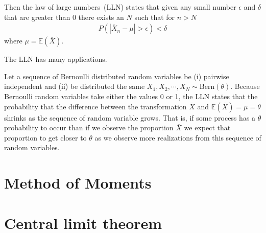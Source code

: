 Then the law of large numbers~(LLN) states that given any small number $\epsilon$ and $\delta$ that are greater than 0 there exists an $N$ such that for $n > N$
\begin{align}
    P( | \overline{X}_{n} - \mu | > \epsilon ) < \delta
\end{align}
where $\mu = \mathbb{E}(\overline{X})$.

The LLN has many applications. 

\ex Let a sequence of Bernoulli distributed random variables be (i) pairwise independent and (ii) be distributed the same $X_{1}, X_{2}, \cdots, X_{N} \sim \text{Bern}(\theta)$. Because Bernoulli random variables take either the values 0 or 1, the LLN states that the probability that the difference between the  transformation $\overline{X}$ and $\mathbb{E}(\overline{X}) = \mu = \theta$ shrinks as the sequence of random variable grows. That is, if some process has a $\theta$ probability to occur than if we observe the proportion $\overline{X}$ we expect that proportion to get closer to $\theta$ as we observe more realizations from this sequence of random variables.  



\section{Method of Moments}\label{intro}


\section{Central limit theorem}\label{intro}


